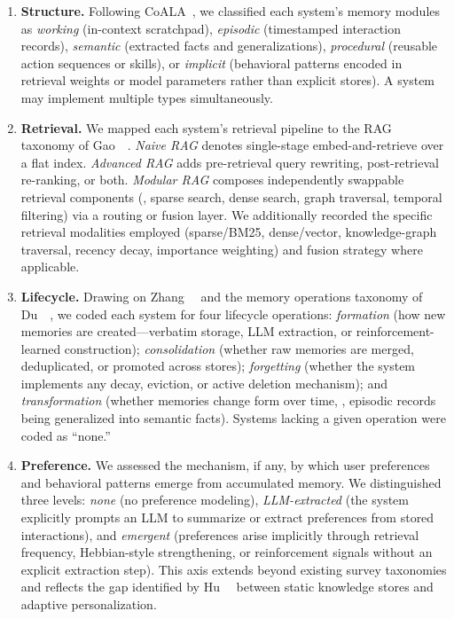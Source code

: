 \begin{enumerate}[leftmargin=*, nosep]
    \item \textbf{Structure.} Following CoALA~\cite{sumers2024coala}, we
    classified each system's memory modules as \emph{working} (in-context
    scratchpad), \emph{episodic} (timestamped interaction records),
    \emph{semantic} (extracted facts and generalizations),
    \emph{procedural} (reusable action sequences or skills), or
    \emph{implicit} (behavioral patterns encoded in retrieval weights or
    model parameters rather than explicit stores). A system may implement
    multiple types simultaneously.

    \item \textbf{Retrieval.} We mapped each system's retrieval pipeline
    to the RAG taxonomy of Gao~\etal~\cite{gao2023rag}. \emph{Naive RAG}
    denotes single-stage embed-and-retrieve over a flat index.
    \emph{Advanced RAG} adds pre-retrieval query rewriting, post-retrieval
    re-ranking, or both. \emph{Modular RAG} composes independently
    swappable retrieval components (\eg, sparse search, dense search,
    graph traversal, temporal filtering) via a routing or fusion layer.
    We additionally recorded the specific retrieval modalities employed
    (sparse/BM25, dense/vector, knowledge-graph traversal, recency decay,
    importance weighting) and fusion strategy where applicable.

    \item \textbf{Lifecycle.} Drawing on Zhang~\etal~\cite{zhang2024survey}
    and the memory operations taxonomy of Du~\etal~\cite{du2025memory}, we
    coded each system for four lifecycle operations: \emph{formation} (how
    new memories are created---verbatim storage, LLM extraction, or
    reinforcement-learned construction); \emph{consolidation} (whether raw
    memories are merged, deduplicated, or promoted across stores);
    \emph{forgetting} (whether the system implements any decay, eviction,
    or active deletion mechanism); and \emph{transformation} (whether
    memories change form over time, \eg, episodic records being
    generalized into semantic facts). Systems lacking a given operation
    were coded as ``none.''

    \item \textbf{Preference.} We assessed the mechanism, if any, by
    which user preferences and behavioral patterns emerge from accumulated
    memory. We distinguished three levels: \emph{none} (no preference
    modeling), \emph{LLM-extracted} (the system explicitly prompts an LLM
    to summarize or extract preferences from stored interactions), and
    \emph{emergent} (preferences arise implicitly through retrieval
    frequency, Hebbian-style strengthening, or reinforcement signals
    without an explicit extraction step). This axis extends beyond existing
    survey taxonomies and reflects the gap identified by
    Hu~\etal~\cite{hu2025memory} between static knowledge stores and
    adaptive personalization.
\end{enumerate}

